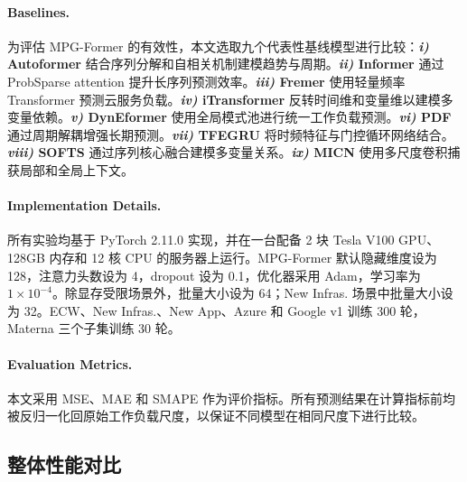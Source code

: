 \documentclass[UTF8]{ctexart}
\begin{document}
\paragraph{Baselines.}
为评估 MPG-Former 的有效性，本文选取九个代表性基线模型进行比较：\textbf{\textit{i)} Autoformer}\cite{wu2021autoformer} 结合序列分解和自相关机制建模趋势与周期。\textbf{\textit{ii)} Informer}\cite{zhou2021informer} 通过 ProbSparse attention 提升长序列预测效率。\textbf{\textit{iii)} Fremer}\cite{zhou2024fremer} 使用轻量频率 Transformer 预测云服务负载。\textbf{\textit{iv)} iTransformer}\cite{liu2024itransformer} 反转时间维和变量维以建模多变量依赖。\textbf{\textit{v)} DynEformer}\cite{wang2023dyn} 使用全局模式池进行统一工作负载预测。\textbf{\textit{vi)} PDF}\cite{dai2024pdf} 通过周期解耦增强长期预测。\textbf{\textit{vii)} TFEGRU}\cite{tfegru2024} 将时频特征与门控循环网络结合。\textbf{\textit{viii)} SOFTS}\cite{han2024softs} 通过序列核心融合建模多变量关系。\textbf{\textit{ix)} MICN}\cite{wang2023micn} 使用多尺度卷积捕获局部和全局上下文。


\paragraph{Implementation Details.}
所有实验均基于 PyTorch 2.11.0 实现，并在一台配备 2 块 Tesla V100 GPU、128GB 内存和 12 核 CPU 的服务器上运行。MPG-Former 默认隐藏维度设为 128，注意力头数设为 4，dropout 设为 0.1，优化器采用 Adam，学习率为 $1\times10^{-4}$。除显存受限场景外，批量大小设为 64；New Infras. 场景中批量大小设为 32。ECW、New Infras.、New App、Azure 和 Google v1 训练 300 轮，Materna 三个子集训练 30 轮。

\paragraph{Evaluation Metrics.}
本文采用 MSE\cite{hyndman2006accuracy}、MAE\cite{willmott2005mae} 和 SMAPE\cite{makridakis2000m3} 作为评价指标。所有预测结果在计算指标前均被反归一化回原始工作负载尺度，以保证不同模型在相同尺度下进行比较。

\newpage

\subsection{整体性能对比}
\end{document}

